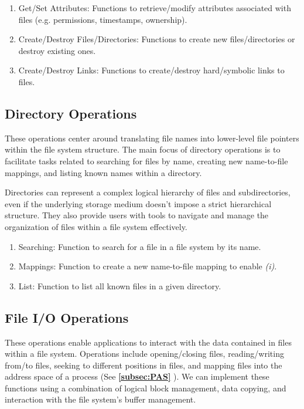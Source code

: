 \documentclass{report}
\newcommand{\refto}[2]{\textbf{\ref{#1:#2} \nameref{#1:#2}}}
\begin{document}
\begin{enumerate}[label=\textit{(\roman*)}]
\item Get/Set Attributes: Functions to retrieve/modify attributes associated with files
(e.g. permissions, timestamps, ownership).
\item Create/Destroy Files/Directories: Functions to create new files/directories or destroy
existing ones.
\item Create/Destroy Links: Functions to create/destroy hard/symbolic links to files.
\end{enumerate}


\subsection{Directory Operations}
These operations center around translating file names into lower-level file pointers within the file
system structure. The main focus of directory operations is to facilitate tasks related to searching
for files by name, creating new name-to-file mappings, and listing known names within a directory.

Directories can represent a complex logical hierarchy of files and subdirectories, even if the
underlying storage medium doesn't impose a strict hierarchical structure. They also provide users
with tools to navigate and manage the organization of files within a file system effectively.

\begin{enumerate}[label=\textit{(\roman*)}]
\item Searching: Function to search for a file in a file system by its name.
\item Mappings: Function to create a new name-to-file mapping to enable \textit{(i)}.
\item List: Function to list all known files in a given directory.
\end{enumerate}


\subsection{File I/O Operations}
These operations enable applications to interact with the data contained in files within a file
system. Operations include opening/closing files, reading/writing from/to files, seeking to
different positions in files, and mapping files into the address space of a process (See
\refto{subsec}{PAS}). We can implement these functions using a combination of logical block
management, data copying, and interaction with the file system's buffer management.
\end{document}

